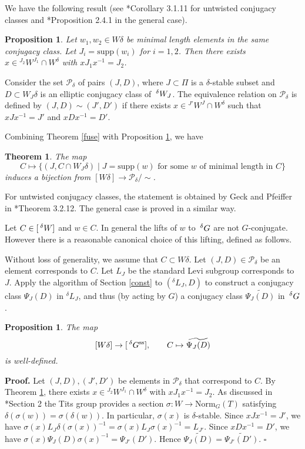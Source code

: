 \documentclass[10pt,leqno]{article}
\newtheorem{theorem}[equation]{Theorem}
\newtheorem{proposition}[equation]{Proposition}
\newcommand{\qed}{\hfill $\square$ \medskip}
\newenvironment{proof}[1][Proof]{\noindent\textbf{#1.} }{\qed}
\newcommand{\Norm}{\text{Norm}}
\renewcommand{\ss}{\text{ss}}
\newcommand{\Wext}{\negthinspace\negthinspace\phantom{a}^\delta W}
\newcommand{\Gext}{\negthinspace\negthinspace\phantom{a}^\delta G}
\begin{document}
We have the following result (see \cite{geck_pfeiffer}*{Corollary
3.1.11} for untwisted conjugacy classes and \cite{CH}*{Proposition
2.4.1} in the general case).

\begin{proposition}\label{x-delta}
	Let $w_1, w_2 \in W\delta$ be minimal length elements in the same conjugacy class. Let $J_i=\text{supp}(w_i)$ for $i=1,2$. Then there exists $x \in {}^{J_2} W^{J_1} \cap W^\delta$ with $x J_1 x^{-1}=J_2$. 
\end{proposition}

Consider the set $\mathcal P_{\delta}$ of pairs $(J, D)$, where $J \subset \Pi$ is a $\delta$-stable subset and $D \subset W_J \delta$ is an elliptic conjugacy class of $\Wext_J$. The equivalence relation on $\mathcal P_{\delta}$ is defined by $(J, D) \sim (J', D')$ if there exists $x \in {}^{J'} W^J \cap W^\delta$ such that $x J x^{-1}=J'$ and $x D x^{-1}=D'$. 

Combining Theorem \ref{fuse} with Proposition \ref{x-delta}, we have 

\begin{theorem}\label{cal-P}
	The map $$C \mapsto \{(J, C \cap W_J \delta)\mid J=\text{supp}(w) \text{ for some } w \text{ of minimal length in } C\}$$ induces a bijection from $[W\delta] \to \mathcal P_{\delta}/\sim$. 
\end{theorem}

For untwisted conjugacy classes, the statement is obtained by Geck and
Pfeiffer in \cite{geck_pfeiffer}*{Theorem 3.2.12}. The general case is
proved in a similar way.

Let $C\in [\Wext]$ and $w \in C$. In general the lifts of $w$ to $\Gext$ are not $G$-conjugate. However there is a reasonable canonical choice of this lifting, defined as follows.

Without loss of generality, we assume that $C \subset W \delta$. Let $(J, D) \in \mathcal P_{\delta}$ be an element corresponds to $C$. Let $L_J$ be the standard Levi subgroup corresponds to $J$.  Apply the algorithm of Section \ref{const} to $({}^\delta L_J, D)$ to construct a conjugacy class $\Psi_J(D)$ in ${}^\delta L_J$, and thus (by acting by $G$) a conjugacy class $\widetilde{\Psi_J(D)}$ in $\Gext$.

\begin{proposition} The map $$[W \delta] \to [\Gext^{\ss}], \qquad C \mapsto \widetilde{\Psi_J(D)}$$ is well-defined. 
\end{proposition}

\begin{proof}
	Let $(J, D), (J', D')$ be elements in $\mathcal P_{\delta}$ that correspond to $C$. By Theorem \ref{cal-P}, there exists $x \in {}^{J_2} W^{J_1} \cap W^\delta$ with $x J_1 x^{-1}=J_2$. As discussed in \cite{AH}*{Section 2} the Tits group provides a section $\sigma:W\rightarrow \Norm_G(T)$ satisfying
	$\delta(\sigma(w))=\sigma(\delta(w))$. In particular, $\sigma(x)$ is $\delta$-stable. Since $x J x^{-1}=J'$, we have $\sigma(x) L_J \delta(\sigma(x))^{-1}=\sigma(x) L_J \sigma(x)^{-1}=L_{J'}$. Since $x D x^{-1}=D'$, we have $\sigma(x) \Psi_J(D) \sigma(x)^{-1}=\Psi_{J'}(D')$. Hence $\widetilde{\Psi_J(D)}=\widetilde{\Psi_{J'}(D')}$. 
\end{proof}
\end{document}
